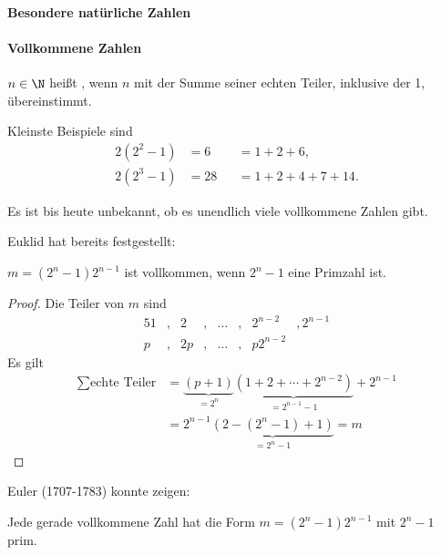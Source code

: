 \paragraph{Besondere natürliche Zahlen}

\paragraph{Vollkommene Zahlen}

\begin{df*}
	$n \in \N$ heißt , wenn $n$ mit der Summe seiner echten Teiler, inklusive der 1, übereinstimmt.
\end{df*}

\begin{ex*}
	Kleinste Beispiele sind
	\begin{align*}
		2(2^2 - 1) &= 6  &&= 1 + 2 + 6, \\
		2(2^3 - 1) &= 28 &&= 1 + 2 + 4 + 7 + 14.
	\end{align*}
\end{ex*}

Es ist bis heute unbekannt, ob es unendlich viele vollkommene Zahlen gibt.


Euklid hat bereits festgestellt:

\begin{st*}[Euklid]
	$m = (2^n - 1) 2^{n-1}$ ist vollkommen, wenn $2^n - 1$ eine Primzahl ist.
	\begin{proof}
		Die Teiler von $m$ sind
		\begin{alignat*}{5}
			1&,& 2 &,& \dotsc&,& 2^{n-2} &, 2^{n-1} \\
			p&,& 2p&,& \dotsc&,& p2^{n-2}
		\end{alignat*}
		Es gilt
		\begin{align*}
			\sum \text{echte Teiler}
			&= \underbrace{(p + 1)}_{=2^n} \underbrace{(1 + 2 + \dotsb + 2^{n-2})}_{=2^{n-1} - 1} + 2^{n-1} \\
			&= 2^{n-1} \underbrace{(2 - (2^n-1) + 1)}_{=2^n-1}
			= m
		\end{align*}
	\end{proof}
\end{st*}

Euler (1707-1783) konnte zeigen:

\begin{st*}
	Jede gerade vollkommene Zahl hat die Form $m = (2^n-1) 2^{n-1}$ mit $2^n - 1$ prim.
\end{st*}

